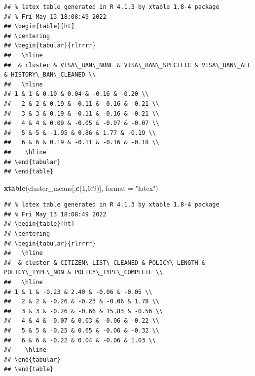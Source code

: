 \documentclass[]{article}
\newenvironment{Shaded}{\begin{snugshade}}{\end{snugshade}}
\newcommand{\DataTypeTok}[1]{\textcolor[rgb]{0.13,0.29,0.53}{#1}}
\newcommand{\DecValTok}[1]{\textcolor[rgb]{0.00,0.00,0.81}{#1}}
\newcommand{\KeywordTok}[1]{\textcolor[rgb]{0.13,0.29,0.53}{\textbf{#1}}}
\newcommand{\NormalTok}[1]{#1}
\newcommand{\OperatorTok}[1]{\textcolor[rgb]{0.81,0.36,0.00}{\textbf{#1}}}
\newcommand{\StringTok}[1]{\textcolor[rgb]{0.31,0.60,0.02}{#1}}
\begin{document}
\begin{verbatim}
## % latex table generated in R 4.1.3 by xtable 1.8-4 package
## % Fri May 13 18:08:49 2022
## \begin{table}[ht]
## \centering
## \begin{tabular}{rlrrrr}
##   \hline
##  & cluster & VISA\_BAN\_NONE & VISA\_BAN\_SPECIFIC & VISA\_BAN\_ALL & HISTORY\_BAN\_CLEANED \\ 
##   \hline
## 1 & 1 & 0.10 & 0.04 & -0.16 & -0.20 \\ 
##   2 & 2 & 0.19 & -0.11 & -0.16 & -0.21 \\ 
##   3 & 3 & 0.19 & -0.11 & -0.16 & -0.21 \\ 
##   4 & 4 & 0.09 & -0.05 & -0.07 & -0.07 \\ 
##   5 & 5 & -1.95 & 0.86 & 1.77 & -0.19 \\ 
##   6 & 6 & 0.19 & -0.11 & -0.16 & -0.18 \\ 
##    \hline
## \end{tabular}
## \end{table}
\end{verbatim}

\begin{Shaded}
\begin{Highlighting}[]
\KeywordTok{xtable}\NormalTok{(cluster_means[,}\KeywordTok{c}\NormalTok{(}\DecValTok{1}\NormalTok{,}\DecValTok{6}\OperatorTok{:}\DecValTok{9}\NormalTok{)], }\DataTypeTok{format =} \StringTok{"latex"}\NormalTok{)}
\end{Highlighting}
\end{Shaded}

\begin{verbatim}
## % latex table generated in R 4.1.3 by xtable 1.8-4 package
## % Fri May 13 18:08:49 2022
## \begin{table}[ht]
## \centering
## \begin{tabular}{rlrrrr}
##   \hline
##  & cluster & CITIZEN\_LIST\_CLEANED & POLICY\_LENGTH & POLICY\_TYPE\_NON & POLICY\_TYPE\_COMPLETE \\ 
##   \hline
## 1 & 1 & -0.23 & 2.40 & -0.06 & -0.05 \\ 
##   2 & 2 & -0.26 & -0.23 & -0.06 & 1.78 \\ 
##   3 & 3 & -0.26 & -0.66 & 15.83 & -0.56 \\ 
##   4 & 4 & -0.07 & 0.03 & -0.06 & -0.22 \\ 
##   5 & 5 & -0.25 & 0.65 & -0.06 & -0.32 \\ 
##   6 & 6 & -0.22 & 0.04 & -0.06 & 1.03 \\ 
##    \hline
## \end{tabular}
## \end{table}
\end{verbatim}
\end{document}
